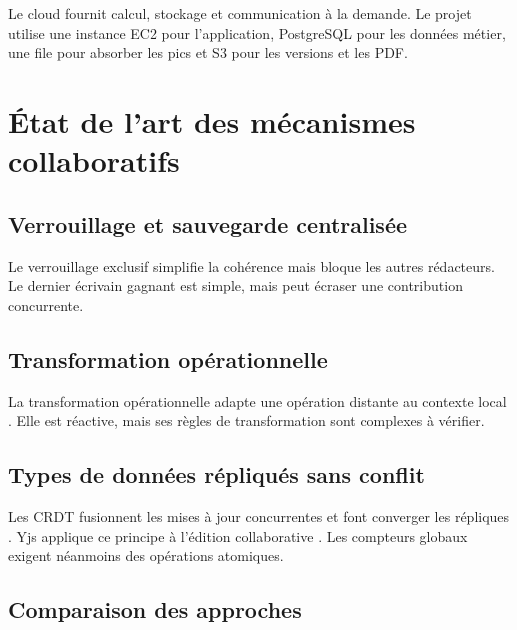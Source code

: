 Le cloud fournit calcul, stockage et communication à la demande. Le projet utilise une instance EC2 pour l'application, PostgreSQL pour les données métier, une file pour absorber les pics et S3 pour les versions et les PDF.

\section{État de l'art des mécanismes collaboratifs}

\subsection{Verrouillage et sauvegarde centralisée}

Le verrouillage exclusif simplifie la cohérence mais bloque les autres rédacteurs. Le dernier écrivain gagnant est simple, mais peut écraser une contribution concurrente.

\subsection{Transformation opérationnelle}

La transformation opérationnelle adapte une opération distante au contexte local \cite{ellis1989}. Elle est réactive, mais ses règles de transformation sont complexes à vérifier.

\subsection{Types de données répliqués sans conflit}

Les CRDT fusionnent les mises à jour concurrentes et font converger les répliques \cite{preguica2009,shapiro2011}. Yjs applique ce principe à l'édition collaborative \cite{yjs}. Les compteurs globaux exigent néanmoins des opérations atomiques.

\subsection{Comparaison des approches}

